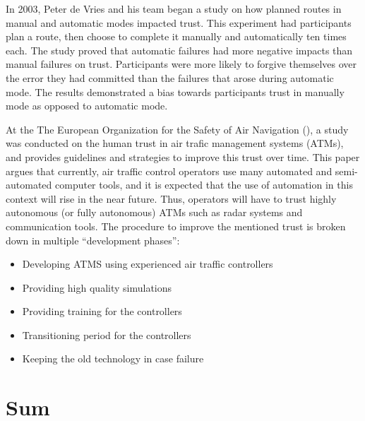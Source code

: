 \documentclass[runningheads,a4paper]{llncs}
\begin{document}
In 2003, Peter de Vries and his team began a study on how planned routes in manual and automatic modes impacted trust\cite{de2003effects}.  This experiment had participants plan a route, then choose to complete it manually and automatically ten times each.  The study proved that automatic failures had more negative impacts than manual failures on trust.  Participants were more likely to forgive themselves over the error they had committed than the failures that arose during automatic mode.  The results demonstrated a bias towards participants trust in manually mode as opposed to automatic mode.

At the The European Organization for the Safety of Air Navigation (\cite{kelly2003guidelines}), a study was conducted on the human trust in air trafic management systems (ATMs), and provides guidelines and strategies to improve this trust over time. This paper argues that currently, air traffic control operators use many automated and semi-automated computer tools, and it is expected that the use of automation in this context will rise in the near future. Thus, operators will have to trust highly autonomous (or fully autonomous) ATMs such as radar systems and communication tools. The procedure to improve the mentioned trust is broken down in multiple ``development phases'':
\begin{itemize}
	\item Developing ATMS using experienced air traffic controllers
	\item Providing high quality simulations
	\item Providing training for the controllers
	\item Transitioning period for the controllers
	\item Keeping the old technology in case failure
\end{itemize}


\section{Sum}
\end{document}
